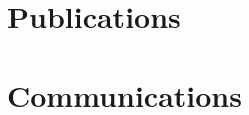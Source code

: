 %
%
%
\chapter*{Publications}
\label{sec:annexe}
\vspace*{-10mm}

\Blindtext[2][2]

\chapter*{Communications}
\label{sec:communications}
\vspace*{-10mm}

\Blindtext[2][2]
